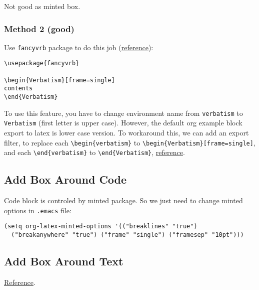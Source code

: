 \documentclass[11pt]{article}
\begin{document}
Not good as minted box.

\subsubsection{Method 2 (good)}
\label{sec:orga2cd247}

Use \texttt{fancyvrb} package to do this job (\href{https://codeyarns.com/2012/12/21/how-to-draw-a-box-around-verbatim-text-in-latex/\#targetText=It is possible to draw,the frame parameter to single.}{reference}):
\begin{Verbatim}[frame=single]
\usepackage{fancyvrb}

\begin{Verbatism}[frame=single]
contents
\end{Verbatism}

\end{Verbatim}

To use this feature, you have to change environment name from \texttt{verbatism} to \texttt{Verbatism} (first letter is upper case). However, the default org example block export to latex is lower case version. To workaround this, we can add an export filter, to replace each \texttt{\textbackslash{}begin\{verbatism\}} to \texttt{\textbackslash{}begin\{Verbatism\}[frame=single]}, and each \texttt{\textbackslash{}end\{verbatism\}} to \texttt{\textbackslash{}end\{Verbatism\}}, \href{https://emacs.stackexchange.com/questions/19903/how-can-i-customize-the-latex-export-of-org-babel-results}{reference}.




\subsection{Add Box Around Code}
\label{sec:orgd1ebf9f}
Code block is controled by minted package. So we just need to change minted options in \texttt{.emacs} file:
\begin{Verbatim}[frame=single]
(setq org-latex-minted-options '(("breaklines" "true")
  ("breakanywhere" "true") ("frame" "single") ("framesep" "10pt")))
\end{Verbatim}


\subsection{Add Box Around Text}
\label{sec:orgafb793d}
\href{https://tex.stackexchange.com/questions/25903/how-to-put-a-long-piece-of-text-in-a-box}{Reference}.
\end{document}
